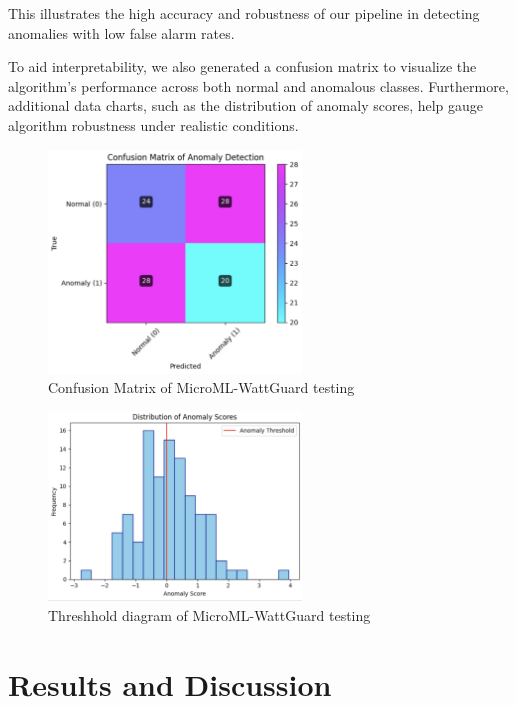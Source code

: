 \documentclass[12pt, draftclsnofoot, onecolumn]{IEEEtran}
\begin{document}
This illustrates the high accuracy and robustness of our pipeline in detecting anomalies with low false alarm rates.

To aid interpretability, we also generated a confusion matrix to visualize the algorithm’s performance across both normal and anomalous classes. Furthermore, additional data charts, such as the distribution of anomaly scores, help gauge algorithm robustness under realistic conditions.

\begin{figure}[h!]
	\centering
	\includegraphics[width=0.6\textwidth]{confusion_matrix.png}
	\caption{Confusion Matrix of MicroML-WattGuard testing}
	\label{fig:confusionmatrix}
\end{figure}

\begin{figure}[h!]
	\centering
	\includegraphics[width=0.6\textwidth]{threshhold_diagram.png}
	\caption{Threshhold diagram of MicroML-WattGuard testing}
	\label{fig:threshhold diagram}
\end{figure}




\section{Results and Discussion}
\end{document}
